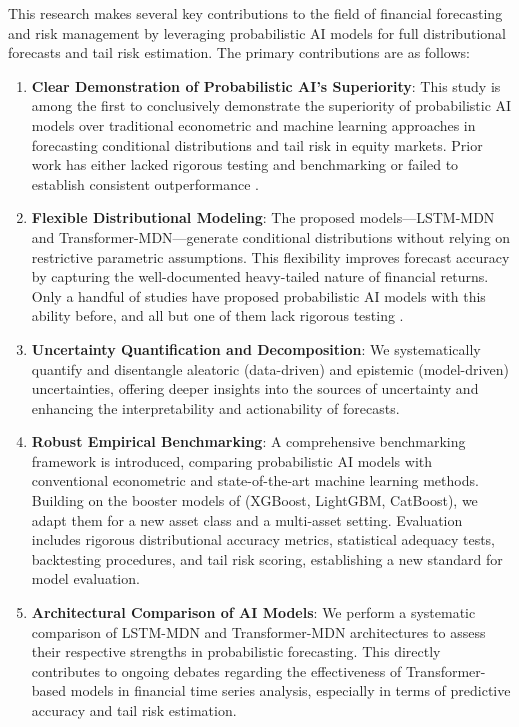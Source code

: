 This research makes several key contributions to the field of financial forecasting and risk management by leveraging probabilistic AI models for full distributional forecasts and tail risk estimation. The primary contributions are as follows:

\begin{enumerate}
    \item \textbf{Clear Demonstration of Probabilistic AI’s Superiority}: This study is among the first to conclusively demonstrate the superiority of probabilistic AI models over traditional econometric and machine learning approaches in forecasting conditional distributions and tail risk in equity markets. Prior work has either lacked rigorous testing and benchmarking or failed to establish consistent outperformance \parencite{eggen2025probabilistic}.
    \item \textbf{Flexible Distributional Modeling}: The proposed models—LSTM-MDN and Transformer-MDN—generate conditional distributions without relying on restrictive parametric assumptions. This flexibility improves forecast accuracy by capturing the well-documented heavy-tailed nature of financial returns. Only a handful of studies have proposed probabilistic AI models with this ability before, and all but one of them lack rigorous testing \parencite{eggen2025probabilistic}.
    \item \textbf{Uncertainty Quantification and Decomposition}: We systematically quantify and disentangle aleatoric (data-driven) and epistemic (model-driven) uncertainties, offering deeper insights into the sources of uncertainty and enhancing the interpretability and actionability of forecasts.
    \item \textbf{Robust Empirical Benchmarking}: A comprehensive benchmarking framework is introduced, comparing probabilistic AI models with conventional econometric and state-of-the-art machine learning methods. Building on the booster models of \textcite{moen2024forecasting} (XGBoost, LightGBM, CatBoost), we adapt them for a new asset class and a multi-asset setting. Evaluation includes rigorous distributional accuracy metrics, statistical adequacy tests, backtesting procedures, and tail risk scoring, establishing a new standard for model evaluation.
    \item \textbf{Architectural Comparison of AI Models}: We perform a systematic comparison of LSTM-MDN and Transformer-MDN architectures to assess their respective strengths in probabilistic forecasting. This directly contributes to ongoing debates regarding the effectiveness of Transformer-based models in financial time series analysis, especially in terms of predictive accuracy and tail risk estimation.

\end{enumerate}
